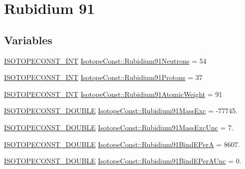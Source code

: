 \hypertarget{group___isotope_const-_rubidium-_rb91}{}\section{Rubidium 91}
\label{group___isotope_const-_rubidium-_rb91}
\subsection*{Variables}
\begin{DoxyCompactItemize}
\item 
\mbox{\hyperlink{group___isotope_const-_macros_ga5f18360b3e99483a35c32d789e62621c}{I\+S\+O\+T\+O\+P\+E\+C\+O\+N\+S\+T\+\_\+\+I\+NT}} \mbox{\hyperlink{group___isotope_const-_rubidium-_rb91_gae29f8873007d857d8d2f75eeaea35c7a}{Isotope\+Const\+::\+Rubidium91\+Neutrons}} = 54
\item 
\mbox{\hyperlink{group___isotope_const-_macros_ga5f18360b3e99483a35c32d789e62621c}{I\+S\+O\+T\+O\+P\+E\+C\+O\+N\+S\+T\+\_\+\+I\+NT}} \mbox{\hyperlink{group___isotope_const-_rubidium-_rb91_ga0421e2de003c05dbce909e3704360c5a}{Isotope\+Const\+::\+Rubidium91\+Protons}} = 37
\item 
\mbox{\hyperlink{group___isotope_const-_macros_ga5f18360b3e99483a35c32d789e62621c}{I\+S\+O\+T\+O\+P\+E\+C\+O\+N\+S\+T\+\_\+\+I\+NT}} \mbox{\hyperlink{group___isotope_const-_rubidium-_rb91_ga941a4da54c3af3416feb33a73290f52e}{Isotope\+Const\+::\+Rubidium91\+Atomic\+Weight}} = 91
\item 
\mbox{\hyperlink{group___isotope_const-_macros_ga8f45a7272ce02c0b4c65c44636ed719a}{I\+S\+O\+T\+O\+P\+E\+C\+O\+N\+S\+T\+\_\+\+D\+O\+U\+B\+LE}} \mbox{\hyperlink{group___isotope_const-_rubidium-_rb91_gaa81b3fd918aceec45284852d91ad6e0a}{Isotope\+Const\+::\+Rubidium91\+Mass\+Exc}} = -\/77745.
\item 
\mbox{\hyperlink{group___isotope_const-_macros_ga8f45a7272ce02c0b4c65c44636ed719a}{I\+S\+O\+T\+O\+P\+E\+C\+O\+N\+S\+T\+\_\+\+D\+O\+U\+B\+LE}} \mbox{\hyperlink{group___isotope_const-_rubidium-_rb91_gaf2768a09e379a17234fcacbb28db1eca}{Isotope\+Const\+::\+Rubidium91\+Mass\+Exc\+Unc}} = 7.
\item 
\mbox{\hyperlink{group___isotope_const-_macros_ga8f45a7272ce02c0b4c65c44636ed719a}{I\+S\+O\+T\+O\+P\+E\+C\+O\+N\+S\+T\+\_\+\+D\+O\+U\+B\+LE}} \mbox{\hyperlink{group___isotope_const-_rubidium-_rb91_ga87eec47a144f0e84e97e7e258b8e977e}{Isotope\+Const\+::\+Rubidium91\+Bind\+E\+PerA}} = 8607.
\item 
\mbox{\hyperlink{group___isotope_const-_macros_ga8f45a7272ce02c0b4c65c44636ed719a}{I\+S\+O\+T\+O\+P\+E\+C\+O\+N\+S\+T\+\_\+\+D\+O\+U\+B\+LE}} \mbox{\hyperlink{group___isotope_const-_rubidium-_rb91_gac2426b6dbbaf82f957d622e8d6d62196}{Isotope\+Const\+::\+Rubidium91\+Bind\+E\+Per\+A\+Unc}} = 0.

\end{DoxyCompactItemize}
